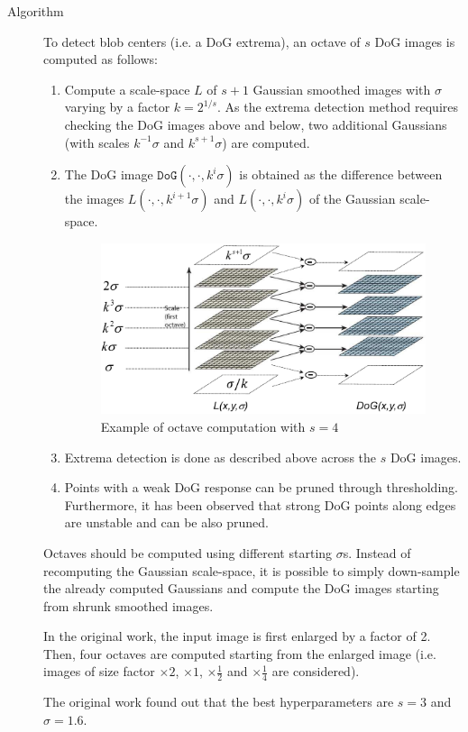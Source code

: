 \begin{description}
    \item[Algorithm] 
        To detect blob centers (i.e. a DoG extrema), an octave of $s$ DoG images is computed as follows:
        \begin{enumerate}
            \item Compute a scale-space $L$ of $s+1$ Gaussian smoothed images with $\sigma$ varying by a factor $k = 2^{1/s}$.
                As the extrema detection method requires checking the DoG images above and below, 
                two additional Gaussians (with scales $k^{-1}\sigma$ and $k^{s+1}\sigma$) are computed.
            \item The DoG image $\texttt{DoG}(\cdot, \cdot, k^i\sigma)$ is obtained as the difference between the 
                images $L(\cdot, \cdot, k^{i+1}\sigma)$ and $L(\cdot, \cdot, k^i\sigma)$ of the Gaussian scale-space.
                \begin{figure}[H]
                    \small
                    \centering
                    \includegraphics[width=0.6\linewidth]{./img/_DoG_octave.pdf}
                    \caption{Example of octave computation with $s=4$}
                \end{figure}
            \item Extrema detection is done as described above across the $s$ DoG images.
            \item Points with a weak DoG response can be pruned through thresholding. 
                Furthermore, it has been observed that strong DoG points along edges are unstable and can be also pruned.
        \end{enumerate}

        Octaves should be computed using different starting $\sigma$s.
        Instead of recomputing the Gaussian scale-space, 
        it is possible to simply down-sample the already computed Gaussians and compute the DoG images starting from shrunk smoothed images.

        \begin{remark}
            In the original work, the input image is first enlarged by a factor of 2.
            Then, four octaves are computed starting from the enlarged image 
            (i.e. images of size factor $\times 2$, $\times 1$, $\times \frac{1}{2}$ and $\times \frac{1}{4}$ are considered).
        \end{remark}

        \begin{remark}
            The original work found out that the best hyperparameters are $s=3$ and $\sigma=1.6$.
        \end{remark}
\end{description}


